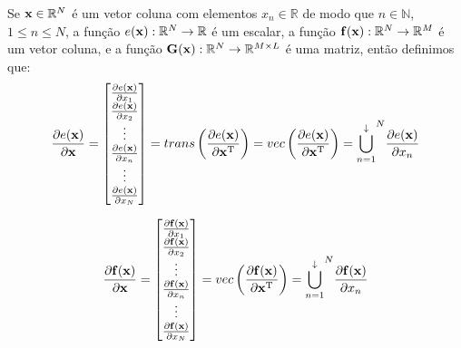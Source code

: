 \begin{definition}\label{def:deltaver}
Se 
$\VECTOR{x}\in \mathbb{R}^N$ é um vetor coluna com elementos $x_n\in \mathbb{R}$ de modo que
$n\in \mathbb{N}$, $1 \leq n \leq N$, 
a função $e(\VECTOR{x}): \mathbb{R}^N \rightarrow \mathbb{R}$ é um escalar,
a função $\VECTOR{f}(\VECTOR{x}): \mathbb{R}^N \rightarrow \mathbb{R}^M$ é um vetor coluna,  e
a função $\MATRIX{G}(\VECTOR{x}): \mathbb{R}^N \rightarrow \mathbb{R}^{M\times L}$ é uma matriz, 
então definimos que:
\begin{equation}
\frac{\partial e(\VECTOR{x}) }{\partial \VECTOR{x}}= 
\left[
\begin{matrix}
\frac{\partial e(\VECTOR{x}) }{\partial x_{1}} \\
\frac{\partial e(\VECTOR{x}) }{\partial x_{2}} \\
\vdots \\
\frac{\partial e(\VECTOR{x}) }{\partial x_{n}} \\
\vdots \\
\frac{\partial e(\VECTOR{x}) }{\partial x_{N}} 
\end{matrix}
\right] = \functrans \left( \frac{\partial e(\VECTOR{x}) }{\partial \VECTOR{x}^{\transpose}} \right) =
\funcvec \left( \frac{\partial e(\VECTOR{x}) }{\partial \VECTOR{x}^{\transpose}} \right) =
{\bigcup\limits_{n=1}^{\downarrow}}^{N}{\frac{\partial e(\VECTOR{x}) }{\partial x_{n}}} 
\end{equation}

\begin{equation}
\frac{\partial \VECTOR{f}(\VECTOR{x}) }{\partial \VECTOR{x}}= 
\left[
\begin{matrix}
\frac{\partial \VECTOR{f}(\VECTOR{x}) }{\partial x_{1}} \\
\frac{\partial \VECTOR{f}(\VECTOR{x}) }{\partial x_{2}} \\
\vdots \\
\frac{\partial \VECTOR{f}(\VECTOR{x}) }{\partial x_{n}} \\
\vdots \\
\frac{\partial \VECTOR{f}(\VECTOR{x}) }{\partial x_{N}}
\end{matrix}
\right] =  \funcvec \left( \frac{\partial \VECTOR{f}(\VECTOR{x}) }{\partial \VECTOR{x}^{\transpose}} \right) =
{\bigcup\limits_{n=1}^{\downarrow}}^{N}{\frac{\partial \VECTOR{f}(\VECTOR{x}) }{\partial x_{n}}}
\end{equation}


\end{definition}
